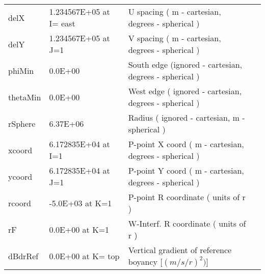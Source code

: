\begin{table}
\begin{tabular}{lllc}
   delX   &      1.234567E+05  at I= east
    &   U spacing ( m - cartesian, degrees - spherical ) 
    &  %
    \\
   delY   &                   1.234567E+05  at J=1 
    &   V spacing ( m - cartesian, degrees - spherical ) 
    &  %
    \\
   phiMin   &                   0.0E+00
    &   South edge (ignored - cartesian, degrees - spherical ) 
    &  %
    \\
   thetaMin   &                   0.0E+00
    &   West edge ( ignored - cartesian, degrees - spherical ) 
    &  %
    \\
   rSphere   &                   6.37E+06
    &   Radius ( ignored - cartesian, m - spherical ) 
    &  %
    \\
   xcoord   &                   6.172835E+04 at I=1
    &   P-point X coord ( m - cartesian, degrees - spherical ) 
    &  %
    \\
   ycoord   &                   6.172835E+04 at J=1
    &   P-point Y coord ( m - cartesian, degrees - spherical ) 
    &  %
    \\
   rcoord   &                  -5.0E+03 at K=1
    &   P-point R coordinate (  units of r ) 
    &  %
    \\
   rF   &                   0.0E+00 at K=1
    &   W-Interf. R coordinate (  units of r ) 
    &  %
    \\
   dBdrRef   &      0.0E+00  at K= top
    &   Vertical gradient of reference boyancy [$(m/s/r)^2)$] 
    &  %
    \\
\end{tabular}
\end{table}

